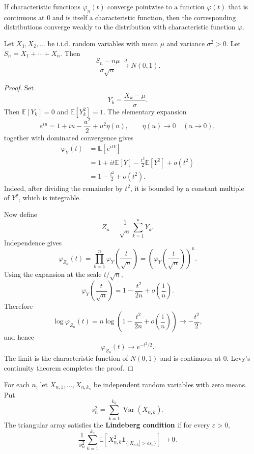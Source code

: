\begin{theorem}
If characteristic functions $\varphi_n(t)$ converge pointwise to a function $\varphi(t)$ that is continuous at $0$ and is itself a characteristic function, then the corresponding distributions converge weakly to the distribution with characteristic function $\varphi$.
\end{theorem}

\begin{theorem}
Let $X_1,X_2,\dots$ be i.i.d. random variables with mean $\mu$ and variance $\sigma^2>0$. Let $S_n=X_1+\cdots+X_n$. Then
\[
    \frac{S_n-n\mu}{\sigma\sqrt{n}}\xrightarrow{d}N(0,1).
\]
\end{theorem}

\begin{proof}
Set
\[
    Y_k=\frac{X_k-\mu}{\sigma}.
\]
Then $\mathbb{E}[Y_k]=0$ and $\mathbb{E}[Y_k^2]=1$. The elementary expansion
\[
    e^{iu}=1+iu-\frac{u^2}{2}+u^2\eta(u),
    \qquad \eta(u)\to0\quad(u\to0),
\]
together with dominated convergence gives
\[
\begin{aligned}
    \varphi_Y(t)
    &=\mathbb{E}[e^{itY}]\\
    &=1+it\mathbb{E}[Y]-\frac{t^2}{2}\mathbb{E}[Y^2]+o(t^2)\\
    &=1-\frac{t^2}{2}+o(t^2).
\end{aligned}
\]
Indeed, after dividing the remainder by $t^2$, it is bounded by a constant multiple of $Y^2$, which is integrable.

Now define
\[
    Z_n=\frac1{\sqrt n}\sum_{k=1}^{n}Y_k.
\]
Independence gives
\[
    \varphi_{Z_n}(t)
    =\prod_{k=1}^{n}\varphi_Y\left(\frac{t}{\sqrt n}\right)
    =\left(\varphi_Y\left(\frac{t}{\sqrt n}\right)\right)^n.
\]
Using the expansion at the scale $t/\sqrt n$,
\[
    \varphi_Y\left(\frac{t}{\sqrt n}\right)
    =1-\frac{t^2}{2n}+o\left(\frac1n\right).
\]
Therefore
\[
    \log\varphi_{Z_n}(t)
    =n\log\left(1-\frac{t^2}{2n}+o\left(\frac1n\right)\right)
    \longrightarrow-\frac{t^2}{2},
\]
and hence
\[
    \varphi_{Z_n}(t)\longrightarrow e^{-t^2/2}.
\]
The limit is the characteristic function of $N(0,1)$ and is continuous at $0$. Levy's continuity theorem completes the proof.
\end{proof}

\begin{definition}
For each $n$, let $X_{n,1},\dots,X_{n,k_n}$ be independent random variables with zero means. Put
\[
    s_n^2=\sum_{k=1}^{k_n}\operatorname{Var}(X_{n,k}).
\]
The triangular array satisfies the \textbf{Lindeberg condition} if for every $\varepsilon>0$,
\[
    \frac1{s_n^2}\sum_{k=1}^{k_n}
    \mathbb{E}\left[
    X_{n,k}^2\mathbf{1}_{\{|X_{n,k}|>\varepsilon s_n\}}
    \right]
    \longrightarrow0.
\]
\end{definition}

